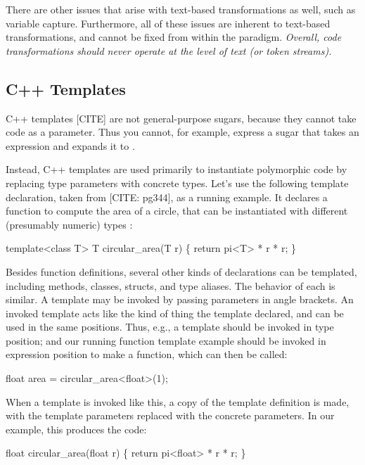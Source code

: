 There are other issues that arise with text-based transformations as
well, such as variable capture. Furthermore, all of these issues are
inherent to text-based transformations, and cannot be
fixed from within the paradigm. \emph{Overall, code transformations
  should never operate at the level of text (or token streams).}

\subsection{C++ Templates} \label{sec:taxonomy-cpp}

C++ templates [CITE] are not general-purpose sugars,
because they cannot take code as a parameter. Thus you cannot, for
example, express a sugar that takes an expression  and expands
it to .

Instead, C++ templates are used
primarily to instantiate polymorphic code by replacing type parameters
with concrete types.  Let's use the following template declaration,
taken from [CITE: pg344], as a running example. It declares a function
to compute the area of a circle, that can be instantiated with
different (presumably numeric) types : %
\begin{Codes}
template<class T>
T circular_area(T r) \{
  return pi<T> * r * r;
\}
\end{Codes}

Besides function definitions, several other kinds of declarations can
be templated, including methods, classes, structs, and type aliases.
The behavior of each is similar. A template may be invoked by passing
parameters in angle brackets. An invoked template acts like the
kind of thing the template declared, and can be used in the same
positions. Thus, e.g., a  template should be invoked in type
position; and our running function template example should be invoked
in expression position to make a function, which can then be called:
\begin{Codes}
  float area = circular_area<float>(1);
\end{Codes}
When a template is invoked like this, a copy of the template
definition is made, with the template parameters replaced with the
concrete parameters.
In our example, this produces the code:
\begin{Codes}
float circular_area(float r) \{
  return pi<float> * r * r;
\}
\end{Codes}

